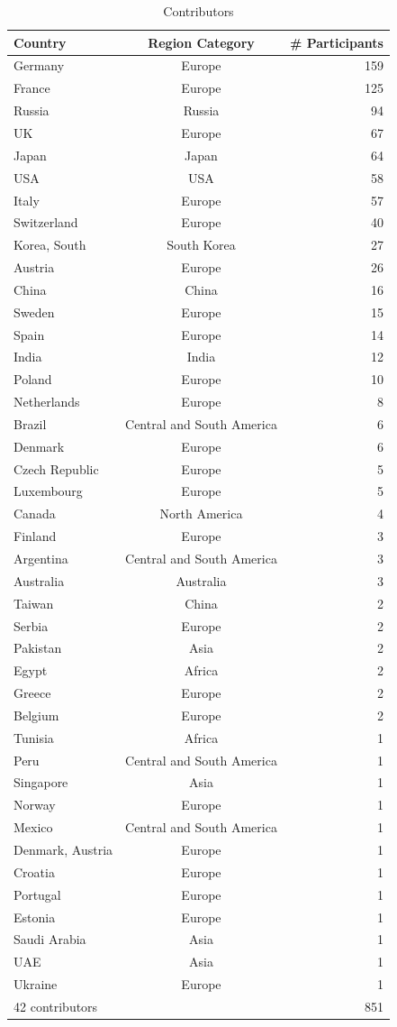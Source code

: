 \documentclass[preprint,5p,times]{elsarticle}
\def\countries{contributors\xspace{}}%
\def\Countries{Contributors\xspace{}}%
\begin{document}
\begin{table}[htb]%
\begin{center}%
\caption{\Countries}
{\footnotesize
\begin{tabular}{l|c|r}%
\hline%
Country & Region Category & \# Participants \\%
\hline%
Germany&Europe&159\\%
France&Europe&125\\%
Russia&Russia&94\\%
UK&Europe&67\\%
Japan&Japan&64\\%
USA&USA&58\\%
Italy&Europe&57\\%
Switzerland&Europe&40\\%
Korea, South&South Korea&27\\%
Austria&Europe&26\\%
China&China&16\\%
Sweden&Europe&15\\%
Spain&Europe&14\\%
India&India&12\\%
Poland&Europe&10\\%
Netherlands&Europe&8\\%
Brazil&{\small Central and South America}&6\\%
Denmark&Europe&6\\%
Czech Republic&Europe&5\\%
Luxembourg&Europe&5\\%
Canada&North America&4\\%
Finland&Europe&3\\%
Argentina&{\small Central and South America}&3\\%
Australia&Australia&3\\%
Taiwan&China&2\\%
Serbia&Europe&2\\%
Pakistan&Asia&2\\%
Egypt&Africa&2\\%
Greece&Europe&2\\%
Belgium&Europe&2\\%
Tunisia&Africa&1\\%
Peru&{\small Central and South America}&1\\%
Singapore&Asia&1\\%
Norway&Europe&1\\%
Mexico&{\small Central and South America}&1\\%
Denmark, Austria&Europe&1\\%
Croatia&Europe&1\\%
Portugal&Europe&1\\%
Estonia&Europe&1\\%
Saudi Arabia&Asia&1\\%
UAE&Asia&1\\%
Ukraine&Europe&1\\%
\hline%
42 \countries & & 851  \\%
\hline%
\end{tabular}%
}%
\end{center}%
\end{table}%
\end{document}
